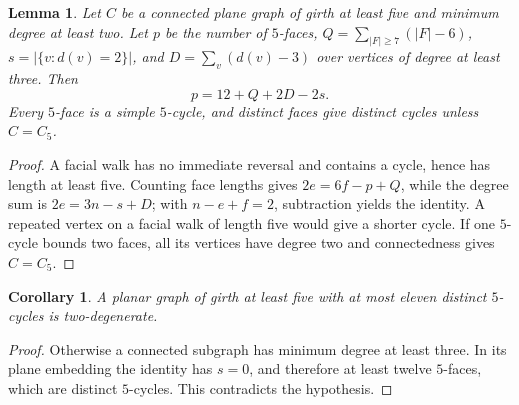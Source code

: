 \documentclass[11pt]{article}
\newtheorem{lemma}[theorem]{Lemma}
\newtheorem{corollary}[theorem]{Corollary}
\theoremstyle{remark}
\numberwithin{equation}{section}
\numberwithin{table}{section}
\begin{document}
\begin{lemma}
\label{lem:five-face-identity-subclass}
Let $C$ be a connected plane graph of girth at least five and minimum degree
at least two.  Let $p$ be the number of $5$-faces,
$Q=\sum_{|F|\ge7}(|F|-6)$, $s=|\{v:d(v)=2\}|$, and
$D=\sum_v(d(v)-3)$ over vertices of degree at least three.  Then
\[
 p=12+Q+2D-2s.
\]
Every $5$-face is a simple $5$-cycle, and distinct faces give distinct
cycles unless $C=C_5$.
\end{lemma}

\begin{proof}
A facial walk has no immediate reversal and contains a cycle, hence has
length at least five.  Counting face lengths gives
$2e=6f-p+Q$, while the degree sum is $2e=3n-s+D$; with $n-e+f=2$,
subtraction yields the identity.  A repeated vertex on a facial walk of
length five would give a shorter cycle.  If one $5$-cycle bounds two faces,
all its vertices have degree two and connectedness gives $C=C_5$.
\end{proof}

\begin{corollary}
\label{cor:eleven-pentagons-two-degenerate}
A planar graph of girth at least five with at most eleven distinct $5$-cycles
is two-degenerate.
\end{corollary}

\begin{proof}
Otherwise a connected subgraph has minimum degree at least three.  In its
plane embedding the identity has $s=0$, and therefore at least twelve
$5$-faces, which are distinct $5$-cycles.  This contradicts the hypothesis.
\end{proof}
\end{document}
